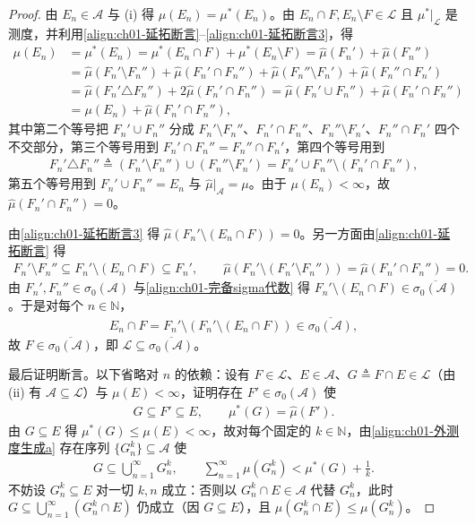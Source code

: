 \documentclass[../../main.tex]{subfiles}%
\begin{document}
\begin{proof}
由 $E_n\in\mathcal{A}$ 与 (i) 得 $\mu(E_n)=\mu^*(E_n)$。由 $E_n\cap F,E_n\setminus F\in\mathcal{L}$ 且 $\mu^*|_{\mathcal{L}}$ 是测度，并利用\eqref{align:ch01-延拓断言}--\eqref{align:ch01-延拓断言3}，得
\begin{align*}
\mu(E_n)&=\mu^*(E_n)=\mu^*(E_n\cap F)+\mu^*(E_n\setminus F)=\widehat{\mu}(F_n')+\widehat{\mu}(F_n'')\\
&=\widehat{\mu}(F_n'\setminus F_n'')+\widehat{\mu}(F_n'\cap F_n'')+\widehat{\mu}(F_n''\setminus F_n')+\widehat{\mu}(F_n''\cap F_n')\\
&=\widehat{\mu}(F_n'\triangle F_n'')+2\widehat{\mu}(F_n'\cap F_n'')=\widehat{\mu}(F_n'\cup F_n'')+\widehat{\mu}(F_n'\cap F_n'')\\
&=\mu(E_n)+\widehat{\mu}(F_n'\cap F_n''),
\end{align*}
其中第二个等号把 $F_n'\cup F_n''$ 分成 $F_n'\setminus F_n''$、$F_n'\cap F_n''$、$F_n''\setminus F_n'$、$F_n''\cap F_n'$ 四个不交部分，第三个等号用到 $F_n'\cap F_n''=F_n''\cap F_n'$，第四个等号用到
\begin{align*}
F_n'\triangle F_n''\triangleq(F_n'\setminus F_n'')\cup(F_n''\setminus F_n')=F_n'\cup F_n''\setminus(F_n'\cap F_n''),
\end{align*}
第五个等号用到 $F_n'\cup F_n''=E_n$ 与 $\widehat{\mu}|_{\mathcal{A}}=\mu$。由于 $\mu(E_n)<\infty$，故 $\widehat{\mu}(F_n'\cap F_n'')=0$。

由\eqref{align:ch01-延拓断言3} 得 $\widehat{\mu}(F_n'\setminus(E_n\cap F))=0$。另一方面由\eqref{align:ch01-延拓断言} 得
\begin{align*}
F_n'\setminus F_n''\subseteq F_n'\setminus(E_n\cap F)\subseteq F_n',\qquad\widehat{\mu}(F_n'\setminus(F_n'\setminus F_n''))=\widehat{\mu}(F_n'\cap F_n'')=0.
\end{align*}
由 $F_n',F_n''\in\sigma_0(\mathcal{A})$ 与\eqref{align:ch01-完备sigma代数} 得 $F_n'\setminus(E_n\cap F)\in\overline{\sigma_0(\mathcal{A})}$。于是对每个 $n\in\mathbb{N}$，
\begin{align*}
E_n\cap F=F_n'\setminus(F_n'\setminus(E_n\cap F))\in\overline{\sigma_0(\mathcal{A})},
\end{align*}
故 $F\in\overline{\sigma_0(\mathcal{A})}$，即 $\mathcal{L}\subseteq\overline{\sigma_0(\mathcal{A})}$。

最后证明断言。以下省略对 $n$ 的依赖：设有 $F\in\mathcal{L}$、$E\in\mathcal{A}$、$G\triangleq F\cap E\in\mathcal{L}$（由 (ii) 有 $\mathcal{A}\subseteq\mathcal{L}$）与 $\mu(E)<\infty$，证明存在 $F'\in\sigma_0(\mathcal{A})$ 使
\begin{align*}
G\subseteq F'\subseteq E,\qquad\mu^*(G)=\widehat{\mu}(F').
\end{align*}
由 $G\subseteq E$ 得 $\mu^*(G)\leqslant\mu(E)<\infty$，故对每个固定的 $k\in\mathbb{N}$，由\eqref{align:ch01-外测度生成a} 存在序列 $\{G_n^k\}\subseteq\mathcal{A}$ 使
\begin{align*}
G\subseteq\bigcup_{n=1}^\infty G_n^k,\qquad\sum_{n=1}^\infty\mu(G_n^k)<\mu^*(G)+\frac{1}{k}.
\end{align*}
不妨设 $G_n^k\subseteq E$ 对一切 $k,n$ 成立：否则以 $G_n^k\cap E\in\mathcal{A}$ 代替 $G_n^k$，此时 $G\subseteq\bigcup_{n=1}^\infty(G_n^k\cap E)$ 仍成立（因 $G\subseteq E$），且 $\mu(G_n^k\cap E)\leqslant\mu(G_n^k)$。


\end{proof}
\end{document}
